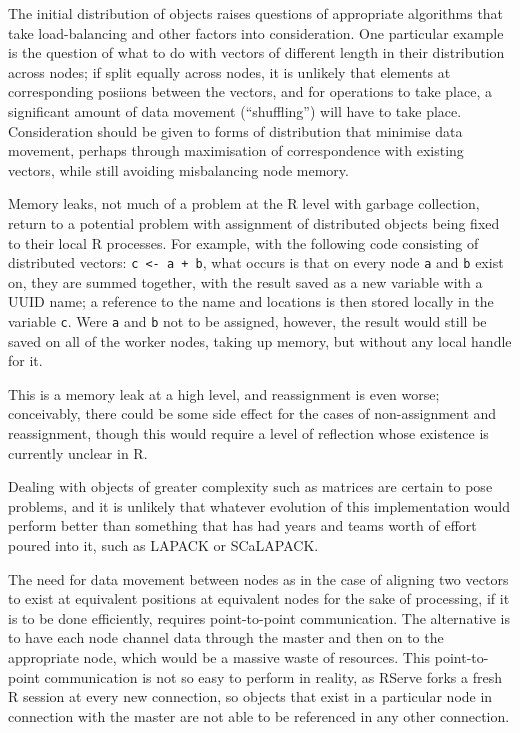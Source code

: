 The initial distribution of objects raises questions of appropriate
algorithms that take load-balancing and other factors into
consideration. One particular example is the question of what to do with
vectors of different length in their distribution across nodes; if split
equally across nodes, it is unlikely that elements at corresponding
posiions between the vectors, and for operations to take place, a
significant amount of data movement (``shuffling'') will have to take
place. Consideration should be given to forms of distribution that
minimise data movement, perhaps through maximisation of correspondence
with existing vectors, while still avoiding misbalancing node memory.

Memory leaks, not much of a problem at the R level with garbage
collection, return to a potential problem with assignment of distributed
objects being fixed to their local R processes. For example, with the
following code consisting of distributed vectors:
\texttt{c\ \textless{}-\ a\ +\ b}, what occurs is that on every node
\texttt{a} and \texttt{b} exist on, they are summed together, with the
result saved as a new variable with a UUID name; a reference to the name
and locations is then stored locally in the variable \texttt{c}. Were
\texttt{a} and \texttt{b} not to be assigned, however, the result would
still be saved on all of the worker nodes, taking up memory, but without
any local handle for it.

This is a memory leak at a high level, and reassignment is even worse;
conceivably, there could be some side effect for the cases of
non-assignment and reassignment, though this would require a level of
reflection whose existence is currently unclear in R.

Dealing with objects of greater complexity such as matrices are certain
to pose problems, and it is unlikely that whatever evolution of this
implementation would perform better than something that has had years
and teams worth of effort poured into it, such as LAPACK or SCaLAPACK.

The need for data movement between nodes as in the case of aligning two
vectors to exist at equivalent positions at equivalent nodes for the
sake of processing, if it is to be done efficiently, requires
point-to-point communication. The alternative is to have each node
channel data through the master and then on to the appropriate node,
which would be a massive waste of resources. This point-to-point
communication is not so easy to perform in reality, as RServe forks a
fresh R session at every new connection, so objects that exist in a
particular node in connection with the master are not able to be
referenced in any other connection.

